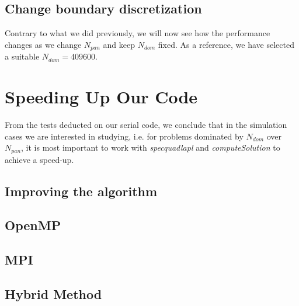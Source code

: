 \documentclass[a4paper,10pt]{article}
\begin{document}
\subsection*{Change boundary discretization}
Contrary to what we did previously, we will now see how the performance changes as we change $N_{pan}$ and keep $N_{dom}$ fixed. As a reference, we have selected a suitable $N_{dom} = 409 600$.




\FloatBarrier
\section*{Speeding Up Our Code}
From the tests deducted on our serial code, we conclude that in the simulation cases we are interested in studying, i.e. for problems dominated by $N_{dom}$ over $N_{pan}$, it is most important to work with \textit{specquadlapl} and \textit{computeSolution} to achieve a speed-up. 

\subsection*{Improving the algorithm}

\subsection*{OpenMP}


\subsection*{MPI}

\subsection*{Hybrid Method}
\end{document}
